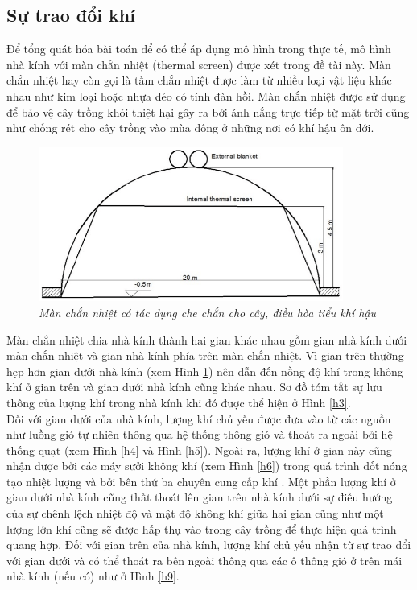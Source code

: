 \documentclass[13pt,a4paper]{article}
\begin{document}
		\subsection{Sự trao đổi khí }
			Để tổng quát hóa bài toán để có thể áp dụng mô hình trong thực tế, mô hình nhà kính với màn
			chắn nhiệt (thermal screen) được xét trong đề tài này. Màn chắn nhiệt hay còn gọi là tấm chắn
			nhiệt được làm từ nhiều loại vật liệu khác nhau như kim loại hoặc nhựa dẻo có tính đàn hồi.
			Màn chắn nhiệt được sử dụng để bảo vệ cây trồng khỏi thiệt hại gây ra bởi ánh nắng trực tiếp
			từ mặt trời cũng như chống rét cho cây trồng vào mùa đông ở những nơi có khí hậu ôn đới.
			\begin{figure}[h!]
				\begin{center}
					\includegraphics[width=10cm]{thermal_screen.png}
					\caption{\textit{Màn chắn nhiệt có tác dụng che chắn cho cây, điều hòa tiểu khí hậu}}
					\label{h2}
				\end{center}
			\end{figure}
			Màn chắn nhiệt chia nhà kính thành hai gian khác nhau gồm gian nhà kính dưới màn chắn nhiệt và gian nhà kính phía trên màn chắn nhiệt. Vì gian trên thường hẹp hơn gian dưới nhà kính (xem Hình \ref{h2}) nên dẫn đến nồng độ khí  trong không khí ở gian trên và gian dưới nhà kính cũng khác nhau. Sơ đồ tóm tắt sự lưu thông của lượng khí  trong nhà kính khi đó được thể hiện ở Hình \ref{h3}.\\
			Đối với gian dưới của nhà kính, lượng khí  chủ yếu được đưa vào từ các nguồn như luồng gió tự nhiên thông qua hệ thống thông gió và thoát ra ngoài bởi hệ thống quạt (xem Hình \ref{h4} và Hình \ref{h5}). Ngoài ra, lượng khí  ở gian này cũng nhận được bởi các máy sưởi không khí (xem Hình \ref{h6}) trong quá trình đốt nóng tạo nhiệt lượng và bởi bên thứ ba chuyên cung cấp khí . Một phần lượng khí  ở gian dưới nhà kính cũng thất thoát lên gian trên nhà kính dưới sự	điều hướng của sự chênh lệch nhiệt độ và mật độ không khí giữa hai gian cũng như một lượng lớn khí  cũng sẽ được hấp thụ vào trong cây trồng để thực hiện quá trình quang hợp. Đối với gian trên của nhà kính, lượng khí  chủ yếu nhận từ sự trao đổi  với gian dưới và có thể thoát ra bên ngoài thông qua các ô thông gió ở trên mái nhà kính (nếu có) như ở Hình \ref{h9}.
\end{document}

